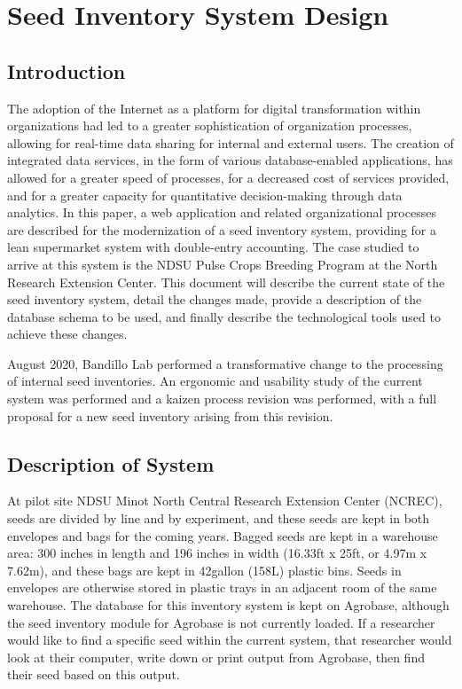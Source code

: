 \documentclass[12pt, letterpaper,oneocolumn]{article}
\begin{document}
	\section{Seed Inventory System Design}

	\subsection{Introduction}
	The adoption of the Internet as a platform for digital transformation within organizations had led to a greater sophistication of organization processes, allowing for real-time data sharing for internal and external users. The creation of integrated data services, in the form of various database-enabled applications, has allowed for a greater speed of processes, for a decreased cost of services provided, and for a greater capacity for quantitative decision-making through data analytics. In this paper, a web application and related organizational processes are described for the modernization of a seed inventory system, providing for a lean supermarket system with double-entry accounting. The case studied to arrive at this system is the NDSU Pulse Crops Breeding Program at the North Research Extension Center. This document will describe the current state of the seed inventory system, detail the changes made, provide a description of the database schema to be used, and finally describe the technological tools used to achieve these changes.

	August 2020, Bandillo Lab performed a transformative change to the processing of internal seed inventories. An ergonomic and usability study of the current system was performed and a kaizen process revision was performed, with a full proposal for a new seed inventory arising from this revision.

	\subsection{Description of System}
	At pilot site NDSU Minot North Central Research Extension Center (NCREC), seeds are divided by line and by experiment, and these seeds are kept in both envelopes and bags for the coming years. Bagged seeds are kept in a warehouse area: 300 inches in length and 196 inches in width (16.33ft x 25ft, or 4.97m x 7.62m), and these bags are kept in 42gallon (158L) plastic bins. Seeds in envelopes are otherwise stored in plastic trays in an adjacent room of the same warehouse. The database for this inventory system is kept on Agrobase, although the seed inventory module for Agrobase is not currently loaded. If a researcher would like to find a specific seed within the current system, that researcher would look at their computer, write down or print output from Agrobase, then find their seed based on this output.
\end{document}
